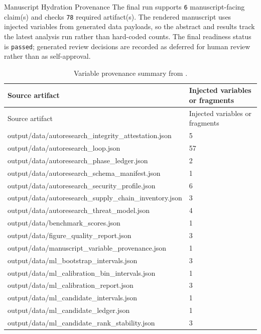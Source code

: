 \documentclass[
  ignorenonframetext,
]{beamer}
\begin{document}
\begin{frame}{Manuscript Hydration Provenance}
\protect{}\label{sec:manuscript-hydration-provenance}
The final run supports \texttt{6} manuscript-facing claim(s) and checks
\texttt{78} required artifact(s). The rendered manuscript uses injected
variables from generated data payloads, so the abstract and results
track the latest analysis run rather than hard-coded counts. The final
readiness status is \texttt{passed}; generated review decisions are
recorded as deferred for human review rather than as self-approval.

\begin{longtable}[]{@{}ll@{}}
\caption{Variable provenance summary from
\protect{}.}\label{tbl:variable-provenance}\tabularnewline
\toprule\noalign{}
Source artifact & Injected variables or fragments \\
\midrule\noalign{}
\endfirsthead
\toprule\noalign{}
Source artifact & Injected variables or fragments \\
\midrule\noalign{}
\endhead
output/data/autoresearch\_integrity\_attestation.json & 5 \\
output/data/autoresearch\_loop.json & 57 \\
output/data/autoresearch\_phase\_ledger.json & 2 \\
output/data/autoresearch\_schema\_manifest.json & 1 \\
output/data/autoresearch\_security\_profile.json & 6 \\
output/data/autoresearch\_supply\_chain\_inventory.json & 3 \\
output/data/autoresearch\_threat\_model.json & 4 \\
output/data/benchmark\_scores.json & 1 \\
output/data/figure\_quality\_report.json & 3 \\
output/data/manuscript\_variable\_provenance.json & 1 \\
output/data/ml\_bootstrap\_intervals.json & 3 \\
output/data/ml\_calibration\_bin\_intervals.json & 1 \\
output/data/ml\_calibration\_report.json & 3 \\
output/data/ml\_candidate\_intervals.json & 1 \\
output/data/ml\_candidate\_ledger.json & 1 \\
output/data/ml\_candidate\_rank\_stability.json & 3 \\

\end{longtable}
\end{frame}
\end{document}
